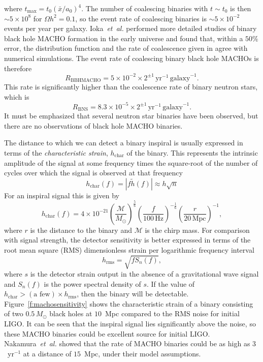 where $t_\mathrm{max} = t_0(\bar{x}/a_0)^4$. The number of coalescing binaries
with $t \sim t_0$ is then $\sim 5 \times 10^{8}$ for $\Omega h^2 = 0.1$, so
the event rate of coalescing binaries is $\sim 5 \times 10^{-2}$ events per
year per galaxy. Ioka~\emph{et~al.}\cite{Ioka:1998nz} performed more detailed
studies of binary black hole MACHO formation in the early universe and found
that, within a $50\%$ error, the distribution function and the rate of
coalescence given in \cite{Nakamura:1997sm} agree with numerical simulations.
The event rate of coalescing binary black hole MACHOs is therefore
\begin{equation}
R_\mathrm{BBHMACHO} = 5\times 10^{-2}\times 2^{\pm
1}\,\mathrm{yr}^{-1}\,\mathrm{galaxy}^{-1}.
\end{equation}
This rate is significantly higher than the coalescence rate of
binary neutron stars, which is\cite{Kalogera:2004tn}
\begin{equation}
R_\mathrm{BNS} = 8.3\times 10^{-5}\times 2^{\pm
1}\,\mathrm{yr}^{-1}\,\mathrm{galaxy}^{-1}.
\end{equation}
It must be emphasized that several neutron star binaries have been
observed, but there are no observations of black hole MACHO binaries.

The distance to which we can detect a binary inspiral is usually expressed in
terms of the \emph{characteristic strain}, $h_\mathrm{char}$ of the binary. This
represents the intrinsic amplitude of the signal at some frequency times the
square-root of the number of cycles over which the signal is observed at that
frequency
\begin{equation}
h_\mathrm{char}(f) = |f \tilde{h}(f)| \approx h \sqrt{n}
\end{equation}
 For an inspiral signal this is given by\cite{Thorne:1982cv}
\begin{equation}
h_\mathrm{char}(f)  =  4 \times 10^{-21} \left(\frac{\mathcal{M}}{{M_\odot}}\right)^\frac{5}{6}
\left(\frac{f}{100\,\mathrm{Hz}}\right)^{-\frac{1}{6}} \left(\frac{r}{20\,
\mathrm{Mpc}}\right)^{-1},
\end{equation}
where $r$ is the distance to the binary and $\mathcal{M}$ is the chirp mass.
For comparison with signal strength, the detector sensitivity is better
expressed in terms of the root mean square (RMS) dimensionless strain per
logarithmic frequency interval
\begin{equation}
h_\mathrm{rms} = \sqrt{f S_n(f)},
\end{equation}
where $s$ is the detector strain output in the absence of a gravitational wave
signal and $S_n(f)$ is the power spectral density of $s$. If the value of
$h_\mathrm{char}
> \left(\textrm{a few}\right) \times h_\mathrm{rms}$, then the binary will be
detectable. Figure~\ref{f:machosensitivity} shows the characteristic strain of
a binary consisting of two $0.5\,M_\odot$ black holes at $10$~Mpc compared to
the RMS noise for initial LIGO. It can be seen that the inspiral signal lies
significantly above the noise, so these MACHO binaries could be excellent
source for initial LIGO. Nakamura~\emph{et~al.}\cite{Nakamura:1997sm} showed
that the rate of MACHO binaries could be as high as $3$~yr$^{-1}$ at a
distance of $15$~Mpc, under their model assumptions.

